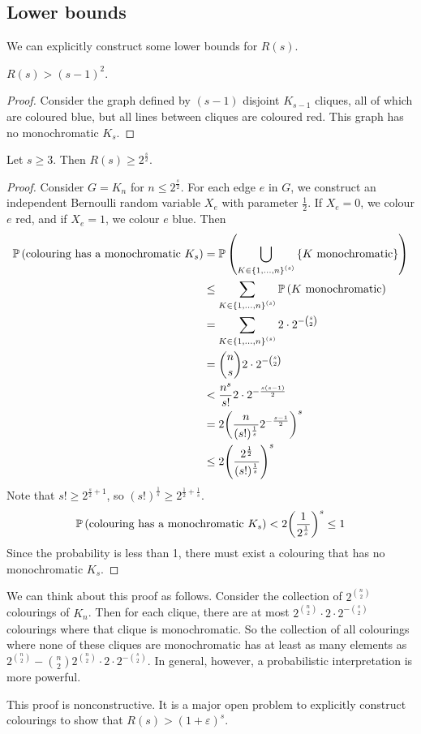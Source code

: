 \subsection{Lower bounds}
We can explicitly construct some lower bounds for \( R(s) \).
\begin{proposition}
	\( R(s) > (s-1)^2 \).
\end{proposition}
\begin{proof}
	Consider the graph defined by \( (s-1) \) disjoint \( K_{s-1} \) cliques, all of which are coloured blue, but all lines between cliques are coloured red.
	This graph has no monochromatic \( K_s \).
\end{proof}
\begin{theorem}[Erd\H{o}s]
	Let \( s \geq 3 \).
	Then \( R(s) \geq 2^{\frac s2} \).
\end{theorem}
\begin{proof}
	Consider \( G = K_n \) for \( n \leq 2^{\frac s 2} \).
	For each edge \( e \) in \( G \), we construct an independent Bernoulli random variable \( X_e \) with parameter \( \frac 12 \).
	If \( X_e = 0 \), we colour \( e \) red, and if \( X_e = 1 \), we colour \( e \) blue.
	Then
	\begin{align*}
		\mathbb{P}\left({\text{colouring has a monochromatic } K_s}\right) &= \mathbb{P}\left({\bigcup_{K \in \qty{1, \dots, n}^{(s)}} \qty{K \text{ monochromatic}}}\right) \\
		&\leq \sum_{K \in \qty{1, \dots, n}^{(s)}} \mathbb{P}\left({K \text{ monochromatic}}\right) \\
		&= \sum_{K \in \qty{1, \dots, n}^{(s)}} 2 \cdot 2^{-\binom s 2} \\
		&= \binom n s 2 \cdot 2^{-\binom s 2} \\
		&< \frac{n^s}{s!} 2 \cdot 2^{-\frac{s(s-1)}{2}} \\
		&= 2 \qty(\frac{n}{(s!)^{\frac 1s}} 2^{-\frac{s-1}{2}})^s \\
		&\leq 2 \qty( \frac{2^{\frac 12}}{(s!)^{\frac 1s}} )^s
	\end{align*}
	Note that \( s! \geq 2^{\frac s 2 + 1} \), so \( (s!)^{\frac 1s} \geq 2^{\frac 12 + \frac 1s} \).
	\[ \mathbb{P}\left({\text{colouring has a monochromatic } K_s}\right) < 2 \qty(\frac{1}{2^{\frac 1s}})^s \leq 1 \]
	Since the probability is less than 1, there must exist a colouring that has no monochromatic \( K_s \).
\end{proof}
\begin{remark}
	We can think about this proof as follows.
	Consider the collection of \( 2^{\binom n 2} \) colourings of \( K_n \).
	Then for each clique, there are at most \( 2^{\binom n 2} \cdot 2 \cdot 2^{-\binom s 2} \) colourings where that clique is monochromatic.
	So the collection of all colourings where none of these cliques are monochromatic has at least as many elements as \( 2^{\binom n 2} - \binom n 2 2^{\binom n 2} \cdot 2 \cdot 2^{-\binom s 2} \).
	In general, however, a probabilistic interpretation is more powerful.
\end{remark}
\begin{remark}
	This proof is nonconstructive.
	It is a major open problem to explicitly construct colourings to show that \( R(s) > (1 + \varepsilon)^s \).
\end{remark}

